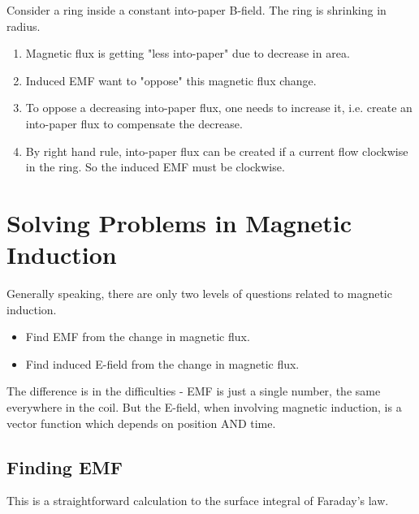 \documentclass[class=article, crop=false, 12pt]{standalone}
\begin{document}
\begin{example}
    Consider a ring inside a constant into-paper B-field.
    The ring is shrinking in radius.
    \begin{enumerate}
        \item Magnetic flux is getting "less into-paper" due to
        decrease in area.
        \item Induced EMF want to "oppose" this magnetic flux change.
        \item To oppose a decreasing into-paper flux, one needs to increase it,
        i.e. create an into-paper flux to compensate the decrease.
        \item By right hand rule, into-paper flux can be created
        if a current flow clockwise in the ring.
        So the induced EMF must be clockwise.
        
    \end{enumerate}


\end{example}
\linesep
\section{Solving Problems in Magnetic Induction}

Generally speaking, there are only two levels of questions related to magnetic induction.
\begin{itemize}
    \item Find EMF from the change in magnetic flux.
    \item Find induced E-field from the change in magnetic flux. 
\end{itemize}

The difference is in the difficulties - 
EMF is just a single number, the same everywhere in the coil.
But the E-field, when involving magnetic induction, 
is a vector function which depends on position AND time.

\subsection{Finding EMF}

This is a straightforward calculation to the surface integral of Faraday's law.
\end{document}
